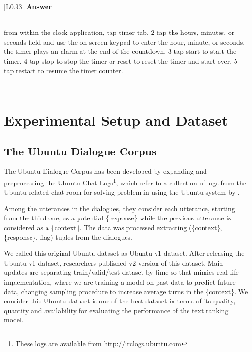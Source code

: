 \documentclass[11pt,a4paper]{article}
\newcommand\Tstrut{\rule{0pt}{2.0ex}}         \newcommand\Bstrut{\rule[-0.9ex]{0pt}{0pt}}
\begin{document}
\begin{table}[bh!]
\vskip 2mm

\begin{tabular}{|L{0.93\columnwidth}|}
\hline
\textbf{Answer} \Tstrut \\ 
 from within the clock application, tap timer tab. 2 tap the hours, minutes, or seconds field and use the on-screen keypad to enter the hour, minute, or seconds. the timer plays an alarm at the end of the countdown. 3 tap start to start the timer. 4 tap stop to stop the timer or reset to reset the timer and start over. 5 tap restart to resume the timer counter. \Tstrut \\
\hline
\end{tabular}

\caption{Example of the Samsung QA dataset.}
\label{t_sample_samsungQA}
\end{table} 

\section{Experimental Setup and Dataset}
\label{dataset}
\subsection{The Ubuntu Dialogue Corpus}
The Ubuntu Dialogue Corpus has been developed by expanding and preprocessing the Ubuntu Chat Logs\footnote{These logs are available from  http://irclogs.ubuntu.com}, which refer to a collection of logs from the Ubuntu-related chat room for solving problem in using the Ubuntu system by \cite{lowe2015ubuntu}.


Among the utterances in the dialogues, they consider each utterance, starting from the third one, as a potential \{response\} while the previous utterance is considered as a \{context\}. 
The data was processed extracting (\{context\}, \{response\}, flag) tuples from  the dialogues. 

We called this original Ubuntu dataset as Ubuntu-v1 dataset.
After releasing the Ubuntu-v1 dataset,
researchers published v2 version of this dataset.
Main updates are separating train/valid/test dataset by time so that mimics real life implementation, where we are training a model on past data to predict future data, changing sampling procedure to increase average turns in the \{context\}.
We consider this Ubuntu dataset is one of the best dataset in terms of its quality, quantity and availability for evaluating the performance of the text ranking model. 
\end{document}
